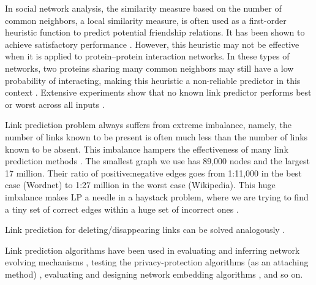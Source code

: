 
In social network analysis, the similarity measure based on the number of common neighbors, a local similarity measure, is often used as a first-order heuristic function to predict potential friendship relations. It has been shown to achieve satisfactory performance \cite{arrar2023comprehensive}. However, this heuristic may not be effective when it is applied to protein–protein interaction networks. In these types of networks, two proteins sharing many common neighbors may still have a low probability of interacting, making this heuristic a non-reliable predictor in this context \cite{arrar2023comprehensive}. Extensive experiments \cite{ghasemian2020stacking} show that no known link predictor performs best or worst across all inputs \cite{zhou2021progresses}.

Link prediction problem always suffers from extreme imbalance, namely, the number of links known to be present is often much less than the number of links known to be absent. This imbalance hampers the effectiveness of many link prediction methods \cite{wang2014link}.
The smallest graph we use has 89,000 nodes and the largest 17 million. Their ratio of positive:negative edges goes from 1:11,000 in the best case (Wordnet) to 1:27 million in the worst case (Wikipedia). This huge imbalance makes LP a needle in a haystack problem, where we are trying to find a tiny set of correct edges within a huge set of incorrect ones \cite{garcia2014link}.

Link prediction for deleting/disappearing links can be solved analogously \cite{wang2014link}.









\cite{zhou2021progresses}

Link prediction algorithms have been used in evaluating and inferring network evolving mechanisms \cite{wang2012evaluating, zhang2015measuring, zhang2017uncovering}, testing the privacy-protection algorithms (as an attaching method) \cite{xian2021towards}, evaluating and designing network embedding algorithms \cite{dehghan2022evaluating, gu2021learning}, and so on.





